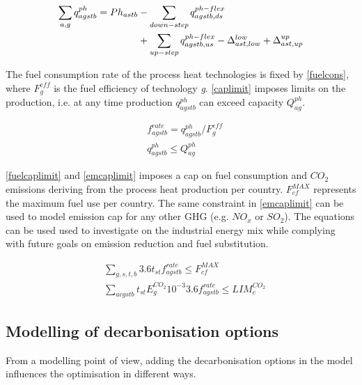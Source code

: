 \documentclass[review]{elsarticle}
\begin{document}
\begin{align}
\sum_{a,g}  q^{ph}_{agstb} = Ph_{astb} &- \sum_{down-step} q^{ph-flex}_{agstb,ds} \notag\\
& + \sum_{up-step} q^{ph-flex}_{agstb,us} - \Delta^{low}_{ast,low} + \Delta^{up}_{ast,up} \label{prcheatbalance}
\end{align}

The fuel consumption rate of the process heat technologies is fixed by \autoref{fuelcons}, where $F^{eff}_{g}$ is the fuel efficiency of technology \textit{g}. 
\autoref{caplimit} imposes limits on the production, i.e. at any time production $q^{ph}_{agstb}$ can exceed capacity $Q^{ph}_{ag}$.

\begin{align}
&  f^{rate}_{agstb} = q^{ph}_{agstb}/F^{eff}_{g} \label{fuelcons} \\
& q^{ph}_{agstb} \leq Q^{ph}_{ag} \label{caplimit}
\end{align}

\autoref{fuelcaplimit} and \autoref{emcaplimit} imposes a cap on fuel consumption and $CO_2$ emissions deriving from the process heat production  per country. $F^{MAX}_{cf}$ represents the maximum fuel use per country. The same constraint in \autoref{emcaplimit} can be used to model emission cap for any other GHG (e.g. $NO_x$ or $SO_2$). The equations can be used used to investigate on the industrial energy mix while complying with future goals on emission reduction and fuel substitution. 

\begin{align}
& \sum_{g,s,t,b} 3.6 t_{st} f^{rate}_{agstb} \leq F^{MAX}_{cf} \label{fuelcaplimit} \\
& \sum_{acgstb} t_{st} E^{CO_{2}}_g 10^{-3} 3.6 f^{rate}_{agstb} \leq LIM^{CO_2}_c \label{emcaplimit}
\end{align}

\subsection{Modelling of decarbonisation options}
From a modelling point of view, adding the decarbonisation options in the model influences the optimisation in different ways. 
\end{document}
